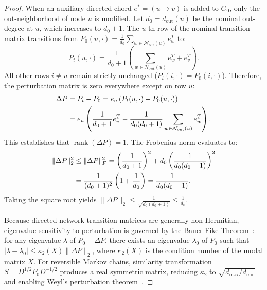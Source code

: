 \documentclass[11pt,a4paper]{article}
\begin{document}
\begin{proof}
When an auxiliary directed chord $e^* = (u \to v)$ is added to $G_0$, only the out-neighborhood of node $u$ is modified. Let $d_0 = d_{\text{out}}(u)$ be the nominal out-degree at $u$, which increases to $d_0 + 1$. The $u$-th row of the nominal transition matrix transitions from $P_0(u, \cdot) = \frac{1}{d_0} \sum_{w \in \mathcal{N}_{\text{out}}(u)} e_w^T$ to:
\begin{equation}
P_t(u, \cdot) = \frac{1}{d_0 + 1} \left( \sum_{w \in \mathcal{N}_{\text{out}}(u)} e_w^T + e_v^T \right).
\end{equation}
All other rows $i \ne u$ remain strictly unchanged ($P_t(i, \cdot) = P_0(i, \cdot)$). Therefore, the perturbation matrix is zero everywhere except on row $u$:
\begin{align}
\Delta P &= P_t - P_0 = e_u \left( P_t(u, \cdot) - P_0(u, \cdot) \right) \notag \\
&= e_u \left( \frac{1}{d_0 + 1} e_v^T - \frac{1}{d_0 (d_0 + 1)} \sum_{w \in \mathcal{N}_{\text{out}}(u)} e_w^T \right).
\end{align}
This establishes that $\operatorname{rank}(\Delta P) = 1$. The Frobenius norm evaluates to:
\begin{align}
\|\Delta P\|_2^2 &\le \|\Delta P\|_F^2 = \left( \frac{1}{d_0 + 1} \right)^2 + d_0 \left( \frac{1}{d_0 (d_0 + 1)} \right)^2 \notag \\
&= \frac{1}{(d_0 + 1)^2} \left( 1 + \frac{1}{d_0} \right) = \frac{1}{d_0 (d_0 + 1)}.
\end{align}
Taking the square root yields $\|\Delta P\|_2 \le \frac{1}{\sqrt{d_0 (d_0 + 1)}} \le \frac{1}{d_0}$.

Because directed network transition matrices are generally non-Hermitian, eigenvalue sensitivity to perturbation is governed by the Bauer-Fike Theorem~\cite{bauer1960norms, bhatia1997matrix}: for any eigenvalue $\lambda$ of $P_0 + \Delta P$, there exists an eigenvalue $\lambda_0$ of $P_0$ such that $|\lambda - \lambda_0| \le \kappa_2(X) \|\Delta P\|_2$, where $\kappa_2(X)$ is the condition number of the modal matrix $X$. For reversible Markov chains, similarity transformation $S = D^{1/2} P_0 D^{-1/2}$ produces a real symmetric matrix, reducing $\kappa_2$ to $\sqrt{d_{\max}/d_{\min}}$ and enabling Weyl's perturbation theorem~\cite{bhatia1997matrix, weyl1912asymptotische}.


\end{proof}
\end{document}
